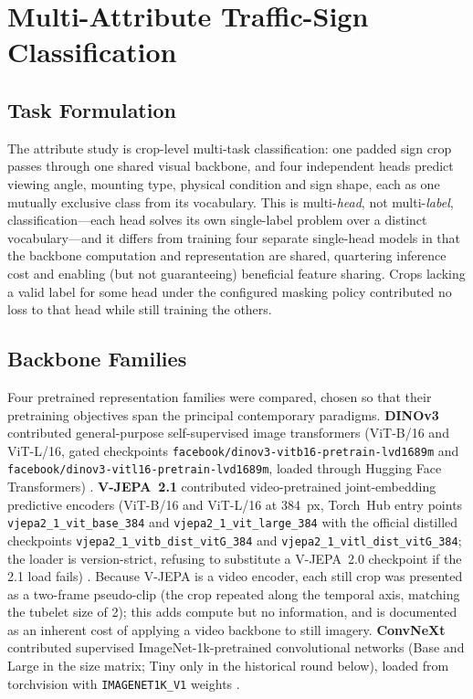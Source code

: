 \section{Multi-Attribute Traffic-Sign Classification}
\label{sec:attribute-classification-methodology}

\subsection{Task Formulation}

The attribute study is crop-level multi-task classification: one padded sign crop passes through one shared visual backbone, and four independent heads predict viewing angle, mounting type, physical condition and sign shape, each as one mutually exclusive class from its vocabulary. This is multi-\emph{head}, not multi-\emph{label}, classification---each head solves its own single-label problem over a distinct vocabulary---and it differs from training four separate single-head models in that the backbone computation and representation are shared, quartering inference cost and enabling (but not guaranteeing) beneficial feature sharing. Crops lacking a valid label for some head under the configured masking policy contributed no loss to that head while still training the others.

\subsection{Backbone Families}

Four pretrained representation families were compared, chosen so that their pretraining objectives span the principal contemporary paradigms. \textbf{DINOv3} contributed general-purpose self-supervised image transformers (ViT-B/16 and ViT-L/16, gated checkpoints \texttt{facebook/\allowbreak dinov3-vitb16-\allowbreak pretrain-\allowbreak lvd1689m} and \texttt{facebook/\allowbreak dinov3-vitl16-\allowbreak pretrain-\allowbreak lvd1689m}, loaded through Hugging Face Transformers) \citep{simeoni2025dinov3}. \textbf{V-JEPA~2.1} contributed video-pretrained joint-embedding predictive encoders (ViT-B/16 and ViT-L/16 at 384~px, Torch~Hub entry points \texttt{vjepa2\_1\_\allowbreak vit\_\allowbreak base\_384} and \texttt{vjepa2\_1\_\allowbreak vit\_\allowbreak large\_384} with the official distilled checkpoints \texttt{vjepa2\_1\_vitb\_\allowbreak dist\_vitG\_384} and \texttt{vjepa2\_1\_vitl\_\allowbreak dist\_vitG\_384}; the loader is version-strict, refusing to substitute a V-JEPA~2.0 checkpoint if the 2.1 load fails) \citep{murlabadia2026vjepa21}. Because V-JEPA is a video encoder, each still crop was presented as a two-frame pseudo-clip (the crop repeated along the temporal axis, matching the tubelet size of 2); this adds compute but no information, and is documented as an inherent cost of applying a video backbone to still imagery. \textbf{ConvNeXt} contributed supervised ImageNet-1k-pretrained convolutional networks (Base and Large in the size matrix; Tiny only in the historical round below), loaded from torchvision with \texttt{IMAGENET1K\_V1} weights \citep{liu2022convnet}.

